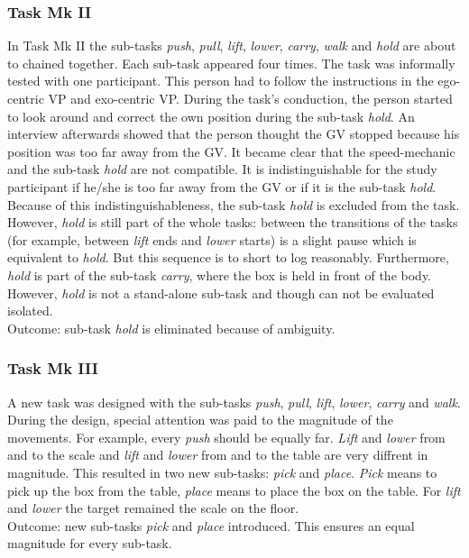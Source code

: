 \subsubsection{Task Mk II}
In Task Mk II the sub-tasks \textit{push}, \textit{pull}, \textit{lift}, \textit{lower}, \textit{carry}, \textit{walk} and \textit{hold} are about to chained together. Each sub-task appeared four times. The task was informally tested with one participant. This person had to follow the instructions in the ego-centric VP and exo-centric VP. During the task's conduction, the person started to look around and correct the own position during the sub-task \textit{hold}. An interview afterwards showed that the person thought the GV stopped because his position was too far away from the GV. It became clear that the speed-mechanic and the sub-task \textit{hold} are not compatible. It is indistinguishable for the study participant if he/she is too far away from the GV or if it is the sub-task \textit{hold}. Because of this indistinguishableness, the sub-task \textit{hold} is excluded from the task. However, \textit{hold} is still part of the whole tasks: between the transitions of the tasks (for example, between \textit{lift} ends and \textit{lower} starts) is a slight pause which is equivalent to \textit{hold}. But this sequence is to short to log reasonably. Furthermore, \textit{hold} is part of the sub-task \textit{carry}, where the box is held in front of the body. However, \textit{hold} is not a stand-alone sub-task and though can not be evaluated isolated.\\
Outcome: sub-task \textit{hold} is eliminated because of ambiguity.

\subsubsection{Task Mk III}
A new task was designed with the sub-tasks \textit{push}, \textit{pull}, \textit{lift}, \textit{lower}, \textit{carry} and \textit{walk}. During the design, special attention was paid to the magnitude of the movements. For example, every \textit{push} should be equally far. \textit{Lift} and \textit{lower} from and to the scale and \textit{lift} and \textit{lower} from and to the table are very diffrent in magnitude. This resulted in two new sub-tasks: \textit{pick} and \textit{place}. \textit{Pick} means to pick up the box from the table, \textit{place} means to place the box on the table. For \textit{lift} and \textit{lower} the target remained the scale on the floor.\\
Outcome: new sub-tasks \textit{pick} and \textit{place} introduced. This ensures an equal magnitude for every sub-task.

